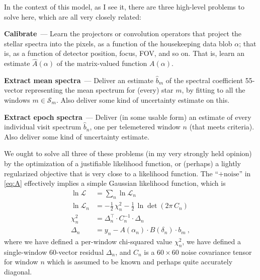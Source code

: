 \documentclass[11pt]{article}
\renewcommand{\paragraph}[1]{\medskip\par\noindent\textbf{#1}~---}
\begin{document}
In the context of this model, as I see it, there are three high-level problems to solve here, which are all very closely related:

\paragraph{Calibrate}
Learn the projectors or convolution operators that project the stellar spectra into the pixels, as a function of the housekeeping data blob $\alpha$; that is, as a function of detector position, focus, FOV, and so on.
That is, learn an estimate $\hat{A}(\alpha)$ of the matrix-valued function $A(\alpha)$.

\paragraph{Extract mean spectra}
Deliver an estimate $\hat{b}_m$ of the spectral coefficient 55-vector representing the mean spectrum for (every) star $m$, by fitting to all the windows $m\in\mathscr{S}_m$. Also deliver some kind of uncertainty estimate on this.

\paragraph{Extract epoch spectra}
Deliver (in some usable form) an estimate of every individual visit spectrum $\hat{b}_n$, one per telemetered window $n$ (that meets criteria). Also deliver some kind of uncertainty estimate.

\medskip

We ought to solve all three of these problems (in my very strongly held opinion) by the optimization of a justifiable likelihood function, or (perhaps) a lightly regularized objective that is very close to a likelihood function.
The ``$+\mbox{noise}$'' in \eqref{eq:A} effectively implies a simple Gaussian likelihood function, which is
\begin{align}
    \ln\mathscr{L} &= \sum_n \ln\mathscr{L}_n \label{eq:lf1}\\
    \ln\mathscr{L}_n &= -\frac{1}{2}\,\chi^2_n - \frac{1}{2}\,\ln\det(2\pi\,C_n)\\
    \chi^2_n &= \Delta_n^\top\cdot C_n^{-1}\cdot \Delta_n \\
    \Delta_n &= y_n - A(\alpha_n)\cdot B(\delta_n)\cdot b_m ~,\label{eq:lf2}
\end{align}
where we have defined a per-window chi-squared value $\chi^2_n$,
we have defined a single-window 60-vector residual $\Delta_n$,
and $C_n$ is a $60\times 60$ noise covariance tensor for window $n$ which is assumed to be known and perhaps quite accurately diagonal.
\end{document}

